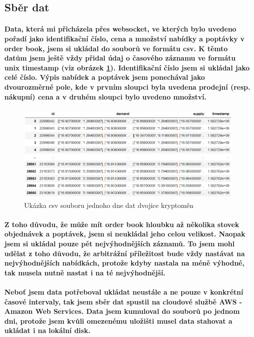 \documentclass[thesis=B,czech]{FITthesis}[2019/03/21]
\begin{document}
\subsection{Sběr dat}
\paragraph{
Data, která mi přicházela přes websocket, ve kterých bylo uvedeno pořadí jako identifikační číslo, cena a množství nabídky a poptávky v order book, jsem si ukládal do souborů ve formátu csv. K těmto datům jsem ještě vždy přidal údaj o časového záznamu ve formátu unix timestamp (viz obrázek \ref{csv_data}). Identifikační číslo jsem si ukládal jako celé číslo. Výpis nabídek a poptávek jsem ponechával jako dvourozměrné pole, kde v prvním sloupci byla uvedena prodejní (resp. nákupní) cena a v druhém sloupci bylo uvedeno množství.
}
\begin{figure}\centering
	\includegraphics[width=1\textwidth]{images/csv_data.PNG}
	\caption{Ukázka csv souboru jednoho dne dat dvojice kryptoměn}\label{csv_data}
\end{figure}
\paragraph{
Z toho důvodu, že může mít order book hloubku až několika stovek objednávek a poptávek, jsem si neukládal jeho celou velikost. Naopak jsem si ukládal pouze pět nejvýhodnějších záznamů. To jsem mohl udělat z toho důvodu, že arbitrážní příležitost bude vždy nastávat na nejvýhodnějších nabídkách, protože kdyby nastala na méně výhodné, tak musela nutně nastat i na té nejvýhodnější. 
}
\paragraph{
Neboť jsem data potřeboval ukládat neustále a ne pouze v konkrétní časové intervaly, tak jsem sběr dat spustil na cloudové službě AWS - Amazon Web Services. Data jsem kumuloval do souborů po jednom dni, protože jsem kvůli omezenému uložišti musel data stahovat a ukládat i na lokální disk.
}
\end{document}
